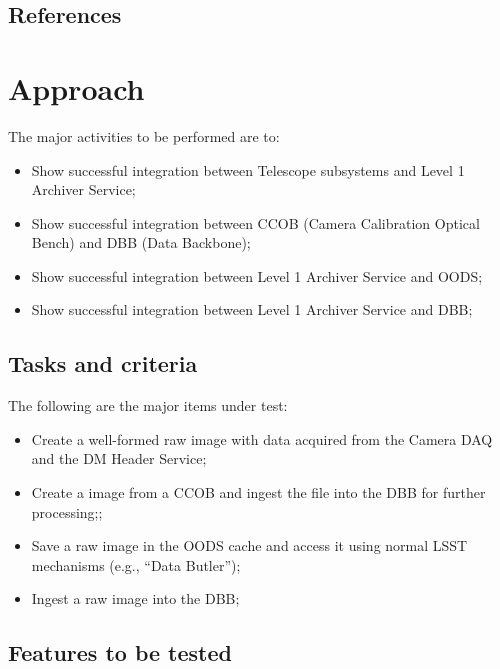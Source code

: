 \documentclass[DM,lsstdraft,STS,toc]{lsstdoc}
\begin{document}
\subsection{References\label{sec:references}}
\renewcommand{\refname}{}





\section{Approach}
\label{sec:approach}


The major activities to be performed are to:
\begin{itemize}
\item{Show successful integration between Telescope subsystems and Level 1 Archiver Service;}
\item{Show successful integration between CCOB (Camera Calibration Optical Bench) and DBB (Data Backbone);}
\item{Show successful integration between Level 1 Archiver Service and OODS;}
\item{Show successful integration between Level 1 Archiver Service and DBB;}
\end{itemize}


\subsection{Tasks and criteria}
\label{sec:tasks}


The following are the major items under test:


\begin{itemize}
\item{Create a well-formed raw image with data acquired from the Camera DAQ and the DM Header Service; }
\item{Create a image from a CCOB  and ingest the file into the DBB for further processing;; }
\item{Save a raw image in the OODS cache and access it using normal LSST mechanisms (e.g., ``Data Butler''); }
\item{Ingest a raw image into the DBB; }
\end{itemize}




\subsection{Features to be tested}
\label{sec:feat2test}
\end{document}
